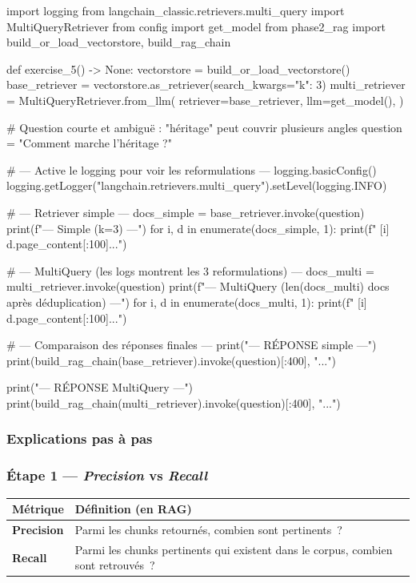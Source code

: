 \documentclass[11pt,a4paper]{article}
\begin{document}
\begin{pythoncode}
import logging
from langchain_classic.retrievers.multi_query import MultiQueryRetriever
from config import get_model
from phase2_rag import build_or_load_vectorstore, build_rag_chain


def exercise_5() -> None:
    vectorstore     = build_or_load_vectorstore()
    base_retriever  = vectorstore.as_retriever(search_kwargs={"k": 3})
    multi_retriever = MultiQueryRetriever.from_llm(
        retriever=base_retriever,
        llm=get_model(),
    )

    # Question courte et ambiguë : "héritage" peut couvrir plusieurs angles
    question = "Comment marche l'héritage ?"

    # --- Active le logging pour voir les reformulations ---
    logging.basicConfig()
    logging.getLogger("langchain.retrievers.multi_query").setLevel(logging.INFO)

    # --- Retriever simple ---
    docs_simple = base_retriever.invoke(question)
    print(f"--- Simple (k=3) ---")
    for i, d in enumerate(docs_simple, 1):
        print(f"  [{i}] {d.page_content[:100]}...")

    # --- MultiQuery (les logs montrent les 3 reformulations) ---
    docs_multi = multi_retriever.invoke(question)
    print(f"\n--- MultiQuery ({len(docs_multi)} docs après déduplication) ---")
    for i, d in enumerate(docs_multi, 1):
        print(f"  [{i}] {d.page_content[:100]}...")

    # --- Comparaison des réponses finales ---
    print("\n--- RÉPONSE simple ---")
    print(build_rag_chain(base_retriever).invoke(question)[:400], "...")

    print("\n--- RÉPONSE MultiQuery ---")
    print(build_rag_chain(multi_retriever).invoke(question)[:400], "...")
\end{pythoncode}

\subsubsection{Explications pas à pas}

\subsubsection*{Étape 1 — \emph{Precision} vs \emph{Recall}}

\begin{center}
\begin{tabular}{p{4cm} p{10cm}}
\toprule
\textbf{Métrique} & \textbf{Définition (en RAG)} \\
\midrule
\textbf{Precision}
& Parmi les chunks retournés, combien sont pertinents~? \\[1mm]
\textbf{Recall}
& Parmi les chunks pertinents qui existent dans le corpus, combien
sont retrouvés~? \\
\bottomrule
\end{tabular}
\end{center}
\end{document}
